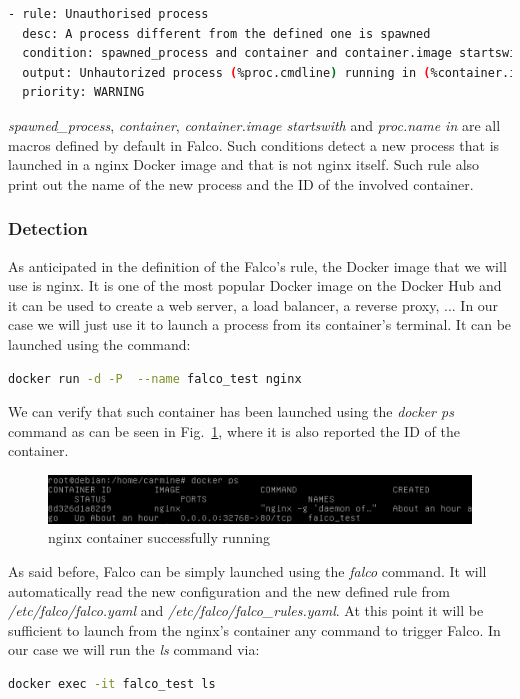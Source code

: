 \documentclass[a4paper,12pt]{article}
\def\myfig#1{Fig.~#1\xspace}
\begin{document}
\begin{lstlisting}[language=bash,breaklines]
- rule: Unauthorised process
  desc: A process different from the defined one is spawned
  condition: spawned_process and container and container.image startswith nginx and not proc.name in (nginx)
  output: Unhautorized process (%proc.cmdline) running in (%container.id)
  priority: WARNING
\end{lstlisting}

\textit{spawned\_process}, \textit{container}, \textit{container.image
startswith} and \textit{proc.name in} are all macros defined by default in
Falco. Such conditions detect a new process that is launched in a nginx Docker
image and that is not nginx itself. Such rule also print out the name of the new
process and the ID of the involved container.

\subsubsection{Detection}

As anticipated in the definition of the Falco's rule, the Docker image that we
will use is nginx. It is one of the most popular Docker image on the Docker Hub
and it can be used to create a web server, a load balancer, a reverse proxy, ...
In our case we will just use it to launch a process from its container's
terminal. It can be launched using the command:

\begin{lstlisting}[language=bash,breaklines]
  docker run -d -P  --name falco_test nginx
\end{lstlisting}

We can verify that such container has been launched using the \textit{docker ps}
command as can be seen in \myfig{\ref{fig:nginx_launched}}, where it is also
reported the ID of the container.

\begin{figure}[ht!]
  \centerline{\includegraphics[width=1\textwidth]{nginx_launched.png}}
  \caption{nginx container successfully running}
  \label{fig:nginx_launched}
  \end{figure}

As said before, Falco can be simply launched using the \textit{falco} command.
It will automatically read the new configuration and the new defined rule from
\textit{/etc/falco/falco.yaml} and \textit{/etc/falco/falco\_rules.yaml}. At
this point it will be sufficient to launch from the nginx's container any
command to trigger Falco. In our case we will run the \textit{ls} command via: 
\begin{lstlisting}[language=bash,breaklines]
  docker exec -it falco_test ls
\end{lstlisting}
\end{document}
